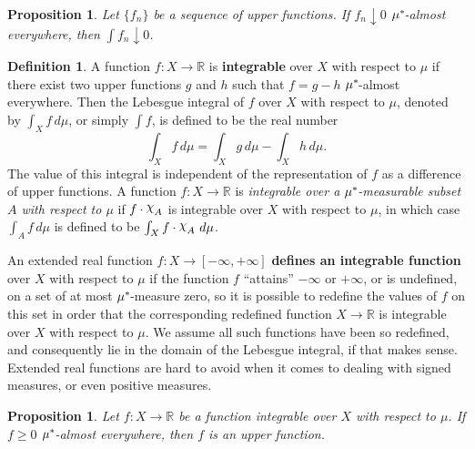 \documentclass[
twoside=true,
paper=letter,
fontsize=9pt,
pagesize=auto,
leqno,
openany,
headsepline,
overfullrule,
]{scrbook}
\theoremstyle{plain}
\theoremstyle{plain}
\newtheorem{prop}[thm]{Proposition}
\theoremstyle{definition}
\newtheorem{defn}[thm]{Definition}
\theoremstyle{bfnoteitalic}
\theoremstyle{bfnoteroman}
\newcommand{\term}[1]{\textbf{#1}\index{#1}}
\newcommand{\charfunction}[1]{\mathop{{\raisebox{2pt}{$\chi$}}_{#1}}}
\newcommand{\R}{\mathbb{R}}
\newcommand{\kernast}{\ast\kern-1pt}
\newcommand{\function}{f}
\newcommand{\measurespace}{X}
\newcommand{\measure}{\mu}
\begin{document}
\begin{prop}
Let $\{f_n\}$ be a sequence of upper functions.  If $f_n\downarrow 0$ $\measure^\kernast$-almost everywhere, then $\int f_n\downarrow 0$.
\end{prop}


\begin{defn}\label{integrable}
A function $f:\measurespace\to\R$ is 
\textbf{integrable} over $\measurespace$ with respect to $\measure$
if there exist two upper functions $g$ and $h$ such that $f = g - h$ $\measure^\kernast$-almost everywhere.  Then the Lebesgue integral  of $f$ over $\measurespace$ with respect to $\measure$, denoted by $\int_\measurespace f\, d\measure$, or simply $\int f$, is defined to be the real number
\[
\int_\measurespace f\,d\measure = \int_\measurespace g\, d\measure -\int_\measurespace h \, d \measure.
\]
The value of this integral is independent of the representation of $f$ as a difference of upper functions.
A function $f:\measurespace\to\R$ is 
\emph{integrable over a $\measure^\kernast$-measurable subset $A$ with respect to $\measure$}
if $f\cdot\charfunction{A}$ is integrable over $\measurespace$ with respect to
$\measure$, in which case $\int_A f\, d\measure$ is defined to be $\int_\measurespace f\cdot\charfunction{A}\, d\measure$.

An extended real function $\function:\measurespace\to [-\infty,+\infty]$ 
\term{defines an integrable function} over $\measurespace$
with respect to $\measure$
if the function $\function$ ``attains'' $-\infty$ or $+\infty$, or is undefined, on a set of at most 
$\measure^\kernast$-measure zero, so it is possible to redefine the values of $\function$ on this set in order that the corresponding redefined function 
$\measurespace\to\R$ is integrable over $\measurespace$ with respect to $\measure$.
We assume all such functions have been so redefined, and consequently lie in the domain of the Lebesgue integral, if that makes sense. Extended real functions are hard to avoid when it comes to dealing with signed measures, or even positive measures.
\end{defn}






\begin{prop}\label{integrable_and_positive_is_upper}
Let $f:\measurespace\to\R$ be a function integrable over $\measurespace$ with respect to $\measure$.   If $f\geq 0$ $\measure^\kernast$-almost everywhere, then $f$ is an upper function.
\end{prop}
\end{document}
